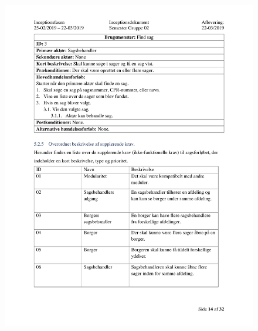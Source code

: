 \begin{figure}[hb]
  \includegraphics[scale = 0.33]{./PNG/Inceptions/Gruppe02+InceptionsDokument-15.jpg} 
\end{figure}

